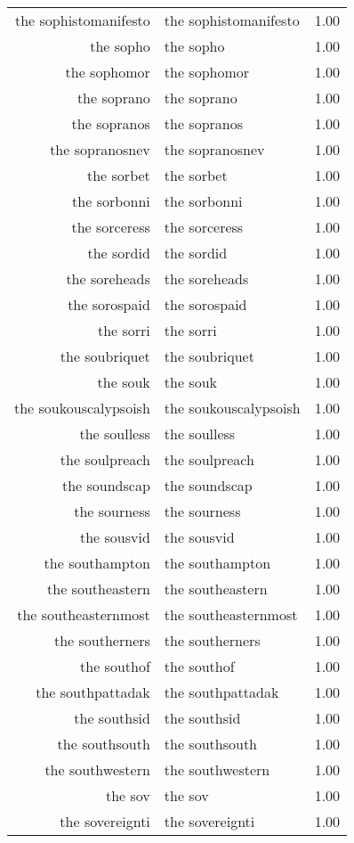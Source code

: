 \begin{table}[ht]
\begin{tabular}{rlr}
  the sophistomanifesto & the sophistomanifesto & 1.00 \\ 
  the sopho & the sopho & 1.00 \\ 
  the sophomor & the sophomor & 1.00 \\ 
  the soprano & the soprano & 1.00 \\ 
  the sopranos & the sopranos & 1.00 \\ 
  the sopranosnev & the sopranosnev & 1.00 \\ 
  the sorbet & the sorbet & 1.00 \\ 
  the sorbonni & the sorbonni & 1.00 \\ 
  the sorceress & the sorceress & 1.00 \\ 
  the sordid & the sordid & 1.00 \\ 
  the soreheads & the soreheads & 1.00 \\ 
  the sorospaid & the sorospaid & 1.00 \\ 
  the sorri & the sorri & 1.00 \\ 
  the soubriquet & the soubriquet & 1.00 \\ 
  the souk & the souk & 1.00 \\ 
  the soukouscalypsoish & the soukouscalypsoish & 1.00 \\ 
  the soulless & the soulless & 1.00 \\ 
  the soulpreach & the soulpreach & 1.00 \\ 
  the soundscap & the soundscap & 1.00 \\ 
  the sourness & the sourness & 1.00 \\ 
  the sousvid & the sousvid & 1.00 \\ 
  the southampton & the southampton & 1.00 \\ 
  the southeastern & the southeastern & 1.00 \\ 
  the southeasternmost & the southeasternmost & 1.00 \\ 
  the southerners & the southerners & 1.00 \\ 
  the southof & the southof & 1.00 \\ 
  the southpattadak & the southpattadak & 1.00 \\ 
  the southsid & the southsid & 1.00 \\ 
  the southsouth & the southsouth & 1.00 \\ 
  the southwestern & the southwestern & 1.00 \\ 
  the sov & the sov & 1.00 \\ 
  the sovereignti & the sovereignti & 1.00 \\ 

\end{tabular}
\end{table}

